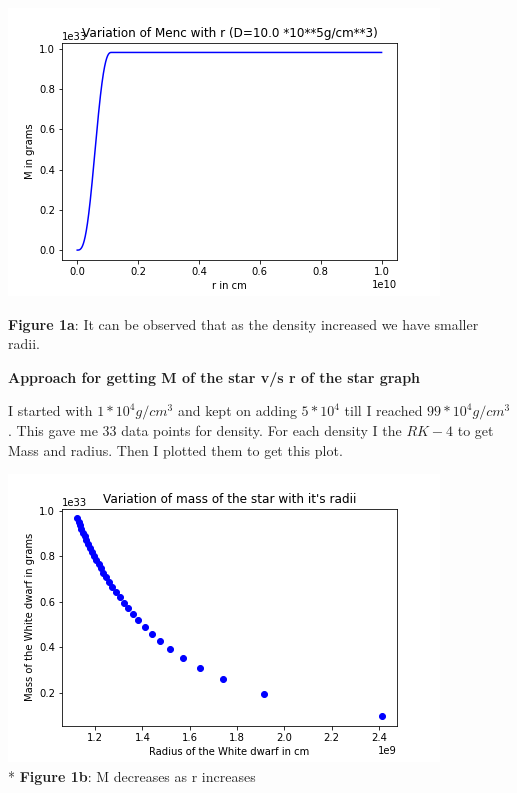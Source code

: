 \documentclass{article}
\begin{document}
\begin{center}
\begin{multicols}{2}
\begin{center}
        \end{center}
\columnbreak
       \includegraphics[scale=0.3]{Images/Mr_pb1_4}
\end{multicols}
\textbf{Figure 1a}: It can be observed that as the density increased we have smaller radii.
\end{center}
\vspace{0.2em}
  \clearpage
\textbf{Approach for getting M of the star v/s r of the star graph}

I started with $1*10^{4}g/cm^{3}$ and kept on adding $5*10^{4}$ till I reached $99*10^{4}g/cm^{3}$. This gave me 33 data points for density. For each density I the $RK-4$ to get Mass and radius. Then I plotted them to get this plot.

\begin{center}
\includegraphics[scale=0.5]{Images/Mr_pb1h}
\\*
\textbf{Figure 1b}: M decreases as r increases
\end{center}

\clearpage
\end{document}
